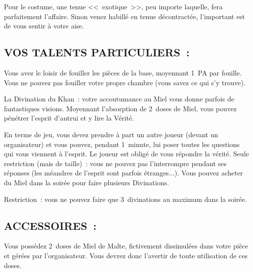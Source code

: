 \documentclass[14pt,twocolumn]{extarticle}
\begin{document}
Pour le costume, une tenue <<~exotique~>>, peu importe laquelle, fera
parfaitement l'affaire. Sinon venez habillé en tenue décontractée, l'important
est de vous sentir à votre aise.


\subsection{VOS TALENTS PARTICULIERS~:}

Vous avez le loisir de fouiller les pièces de la base, moyennant 1~PA par
fouille. Vous ne pouvez pas fouiller votre propre chambre (vous savez ce qui
s'y trouve).

La Divination du Khan~: votre accoutumance au Miel vous donne parfois de
fantastiques visions. Moyennant l'absorption de 2~doses de Miel, vous pouvez
pénétrer l'esprit d'autrui et y lire la Vérité.

En terme de jeu, vous devez prendre à part un autre joueur (devant un
organisateur) et vous pouvez, pendant 1~minute, lui poser toutes les questions
qui vous viennent à l'esprit. Le joueur est obligé de vous répondre la vérité.
Seule restriction (mais de taille)~: vous ne pouvez pas l'interrompre pendant
ses réponses (les méandres de l'esprit sont parfois étranges...). Vous pouvez
acheter du Miel dans la soirée pour faire plusieurs Divinations.

Restriction~: vous ne pouvez faire que 3~divinations au maximum dans la
soirée.

\subsection{ACCESSOIRES~:}

Vous possédez 2~doses de Miel de Malte, fictivement dissimulées dans votre
pièce et gérées par l'organisateur. Vous devrez donc l'avertir de toute
utilisation de ces doses.
\end{document}
